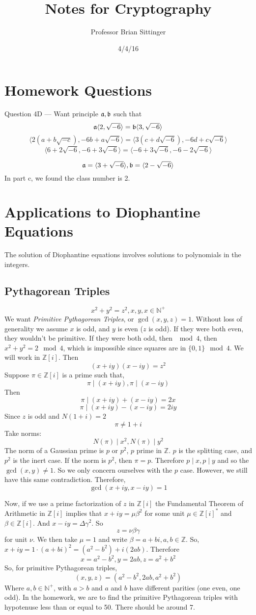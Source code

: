 \documentclass{article}
\title{Notes for Cryptography}
\author{Professor Brian Sittinger}
\date{4/4/16}
\begin{document}
\maketitle
\section{Homework Questions}
Question 4D --- Want principle $\mathfrak{a}, \frak{b}$ such that 
\[ \frak{a}\langle 2, \sqrt{-6} \rangle = \frak{b} \langle 3, \sqrt{-6} \rangle
\]
\[ \langle 2(a+b\sqrt{-c}), -6b+a\sqrt{-6} \rangle = 
\langle 3(c+d\sqrt{-6}), -6d+c\sqrt{-6} \rangle \]
\[ \langle 6 + 2\sqrt{-6}, -6+3\sqrt{-6}\rangle = \langle -6 + 3 \sqrt{-6},
-6-2\sqrt{-6} \rangle \]

\[ \frak{a} = \langle 3 + \sqrt{-6} \rangle, \frak{b} = \langle 2-\sqrt{-6} \rangle \]
In part c, we found the class number is 2. 

\section{Applications to Diophantine Equations}
The solution of Diophantine equations involves solutions to polynomials in the integers. 
\subsection{Pythagorean Triples}
\[ x^2 + y^2 = z^2 , x,y,x \in \mathbb{N}^{+}\]
We want \emph{Primitive Pythagorean Triples}, or $\gcd(x,y,z) = 1$. Without loss
of generality we assume $x$ is odd, and $y$ is even ($z$ is odd). If they were
both even, they wouldn't be primitive. If they were both odd, then $\mod 4$,
then $x^2 + y^2 = 2 \mod 4$, which is impossible since squares are in
$\{0,1\}\mod 4$. We will work in $\mathbb{Z}[i]$. Then
\[ (x+iy)(x-iy) = z^2 \]
Suppose $\pi \in \mathbb{Z}[i]$ is a prime such that,
\[ \pi \mid (x+iy), \pi \mid (x-iy) \]
Then
\[ \pi \mid (x+iy)+(x-iy) = 2x \]
\[ \pi \mid (x+iy)-(x-iy) = 2iy \]
Since $z$ is odd and $N(1+i) = 2$
\[ \pi \neq 1 + i \]
Take norms:
\[ N(\pi) \mid x^2, N(\pi) \mid y^2 \]
The norm of a Gaussian prime is $p$ or $p^2$, $p$ prime in $\mathbb{Z}$. $p$ is
the splitting case, and $p^2$ is the inert case. If the norm is $p^2$, then $\pi
= p$. Therefore $p \mid x, p \mid y$ and so the $\gcd(x,y) \neq 1$. So we only
concern ourselves with the $p$ case. However, we still have this same
contradiction. Therefore, 
\[ \gcd(x+iy, x-iy) = 1 \]

Now, if we use a prime factorization of $z$ in $\mathbb{Z}[i]$ the Fundamental
Theorem of Arithmetic in $\mathbb{Z}[i]$ implies that $x+iy= \mu \beta^2 $ for
some unit $\mu \in \mathbb{Z}[i]^*$ and $\beta \in \mathbb{Z}[i]$. And $x-iy =
\Delta \gamma^2 $. So
\[ z = \nu \beta \gamma \]
for unit $\nu$. We then take $\mu = 1$ and write $\beta = a + bi, a,b \in
\mathbb{Z}$. So, $x+iy = 1\cdot(a+bi)^2 = (a^2 - b^2) + i(2ab)$. Therefore
\[ x = a^2 - b^2, y = 2ab, z = a^2 + b^2 \]
So, for primitive Pythagorean triples,
\[ (x,y,z) = (a^2 - b^2, 2ab, a^2+b^2) \]
Where $a, b \in \mathbb{N}^+$, with $a > b$ and $a$ and $b$ have different
parities (one even, one odd). In the homework, we are to find the primitive
Pythagorean triples with hypotenuse less than or equal to 50. There should be
around 7. 
\end{document}
